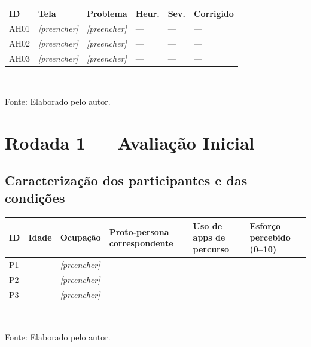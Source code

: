 \begin{quadro}[htb]
\centering
\caption{Problemas identificados na avaliação heurística}
\label{quad:res_heuristica}
\footnotesize
\begin{tabular}{p{1.0cm} p{3.0cm} p{4.4cm} p{1.2cm} p{1.2cm} p{1.4cm}}
\toprule
\textbf{ID} & \textbf{Tela} & \textbf{Problema} & \textbf{Heur.} &
\textbf{Sev.} & \textbf{Corrigido} \\
\midrule
AH01 & \textit{[preencher]} & \textit{[preencher]} & --- & --- & --- \\
AH02 & \textit{[preencher]} & \textit{[preencher]} & --- & --- & --- \\
AH03 & \textit{[preencher]} & \textit{[preencher]} & --- & --- & --- \\
\bottomrule
\end{tabular}
\\[4pt]
\begin{flushleft}
Fonte: Elaborado pelo autor.
\end{flushleft}
\end{quadro}


\section{Rodada 1 --- Avaliação Inicial}
\label{sec:res_rodada1}

\subsection{Caracterização dos participantes e das condições}

\begin{quadro}[htb]
\centering
\caption{Perfil dos participantes da Rodada 1}
\label{quad:res_perfil_r1}
\footnotesize
\begin{tabular}{p{1.0cm} p{1.0cm} p{2.8cm} p{2.6cm} p{2.4cm} p{2.0cm}}
\toprule
\textbf{ID} & \textbf{Idade} & \textbf{Ocupação} & \textbf{Proto-persona
correspondente} & \textbf{Uso de apps de percurso} & \textbf{Esforço percebido
(0--10)} \\
\midrule
P1 & --- & \textit{[preencher]} & --- & --- & --- \\
P2 & --- & \textit{[preencher]} & --- & --- & --- \\
P3 & --- & \textit{[preencher]} & --- & --- & --- \\
\bottomrule
\end{tabular}
\\[4pt]
\begin{flushleft}
Fonte: Elaborado pelo autor.
\end{flushleft}
\end{quadro}

